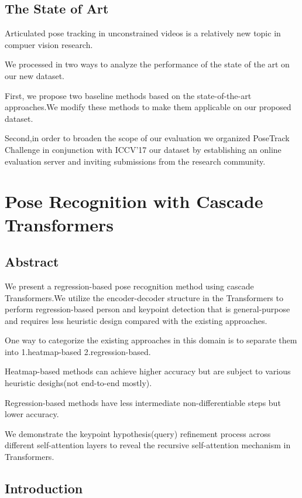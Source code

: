 \documentclass[11pt]{article}
\begin{document}
\subsection{The State of Art}

Articulated pose tracking in unconstrained videos is a relatively new topic in compuer vision research.

We processed in two ways to analyze the performance of the state of the art on our new dataset.

First, we propose two baseline methods based on the state-of-the-art approaches.We modify these methods to make them applicable on our proposed dataset.

Second,in order to broaden the scope of our evaluation we organized PoseTrack Challenge in conjunction with ICCV'17 our dataset by establishing an online evaluation server and inviting submissions from the research community.

\section{Pose Recognition with Cascade Transformers}

\subsection{Abstract}

We present a regression-based pose recognition method using cascade Transformers.We utilize the encoder-decoder structure in the Transformers to perform regression-based person and keypoint detection that is general-purpose and requires less heuristic design compared with the existing approaches.

One way to categorize the existing approaches in this domain is to separate them into 1.heatmap-based 2.regression-based.

Heatmap-based methods can achieve higher accuracy but are subject to various heuristic desighs(not end-to-end mostly).

Regression-based methods have less intermediate non-differentiable steps but lower accuracy.

We demonstrate the keypoint hypothesis(query) refinement process across different self-attention layers to reveal the recursive self-attention mechanism in Transformers. 

\subsection{Introduction}
\end{document}
